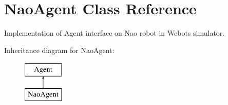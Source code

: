 \section{Nao\+Agent Class Reference}
\label{a00003}


Implementation of Agent interface on Nao robot in Webots simulator.  


Inheritance diagram for Nao\+Agent\+:\begin{figure}[H]
\begin{center}
\leavevmode
\includegraphics[height=2.000000cm]{a00003}
\end{center}
\end{figure}
